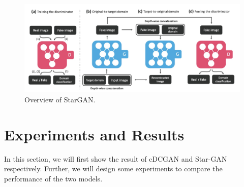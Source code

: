 \documentclass{article}
\begin{document}
\begin{figure}[H]
\begin{center}
  \centering
  \includegraphics[width=5in]{image/stargan.png}
\end{center}
\caption{Overview of StarGAN.}
\label{stargan}
\end{figure}

\section{Experiments and Results}
In this section, we will first show the result of cDCGAN and Star-GAN respectively. Further, we will design some experiments to compare the performance of the two models.
\end{document}
